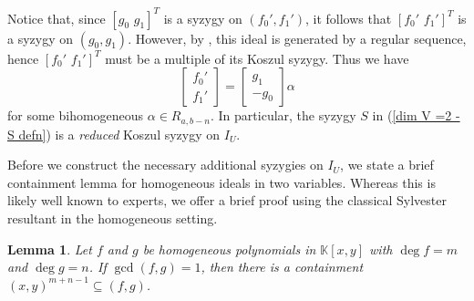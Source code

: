 \documentclass[reqno]{amsart}
\newtheorem{lemma}[thm]{Lemma}
\numberwithin{equation}{section}
\theoremstyle{definition}
\def\K{\mathbb{K}}
\begin{document}
Notice that, since $[g_0\,\,g_1]^T$ is a syzygy on $(f_0',f_1')$, it follows that $[f_0'\,\,f_1']^T$ is a syzygy on $(g_0,g_1)$. However, by , this ideal is generated by a regular sequence, hence $[f_0'\,\,f_1']^T$ must be a multiple of its Koszul syzygy. Thus we have
\begin{equation}\label{dim V=2 - f_0' f_1' matrix equation}
    \left[
\begin{array}{c}
     f_0' \\
     f_1'
\end{array}
    \right] = \left[
\begin{array}{c}
     g_1 \\
     -g_0
\end{array}
    \right]\alpha
\end{equation}
for some bihomogeneous $\alpha\in R_{a,b-n}$. In particular, the syzygy $S$ in (\ref{dim V =2 - S defn}) is a \textit{reduced} Koszul syzygy on $I_U$.

Before we construct the necessary additional syzygies on $I_U$, we state a brief containment lemma for homogeneous ideals in two variables. Whereas this is likely well known to experts, we offer a brief proof using the classical Sylvester resultant in the homogeneous setting.
 



\begin{lemma}\label{Sylvester containment lemma}
Let $f$ and $g$ be homogeneous polynomials in $\K[x,y]$ with $\deg f = m$ and $\deg g =n$. If $\gcd (f,g) = 1$, then there is a containment $(x,y)^{m+n-1} \subseteq (f,g)$.
\end{lemma}
\end{document}
